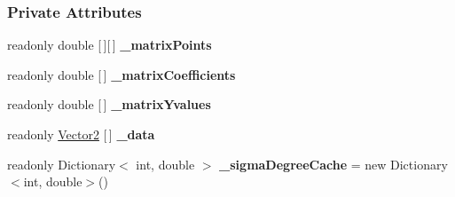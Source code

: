 \subsubsection*{Private Attributes}
\begin{DoxyCompactItemize}
\item 
\mbox{\label{classDataTools_1_1regression_1_1PolynomialRegression_aca3ede634f3229481966f3dec1416637}} 
readonly double \mbox{[}$\,$\mbox{]}\mbox{[}$\,$\mbox{]} {\bfseries \+\_\+matrix\+Points}
\item 
\mbox{\label{classDataTools_1_1regression_1_1PolynomialRegression_a0b80bbac83f48dee1c054bb18e247390}} 
readonly double \mbox{[}$\,$\mbox{]} {\bfseries \+\_\+matrix\+Coefficients}
\item 
\mbox{\label{classDataTools_1_1regression_1_1PolynomialRegression_a39cf7595286e559b072d9ba9f7abd820}} 
readonly double \mbox{[}$\,$\mbox{]} {\bfseries \+\_\+matrix\+Yvalues}
\item 
\mbox{\label{classDataTools_1_1regression_1_1PolynomialRegression_a4ec0ac531c2106052e0166839275e2b4}} 
readonly \hyperlink{classDataTools_1_1Vector2}{Vector2} \mbox{[}$\,$\mbox{]} {\bfseries \+\_\+data}
\item 
\mbox{\label{classDataTools_1_1regression_1_1PolynomialRegression_a65c258a2dd8329a60210cd8559d89209}} 
readonly Dictionary$<$ int, double $>$ {\bfseries \+\_\+sigma\+Degree\+Cache} = new Dictionary$<$int, double$>$()
\end{DoxyCompactItemize}
